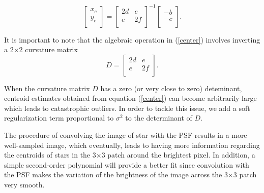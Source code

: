 \documentclass[12pt, preprint]{aastex}
\newcommand{\beq}{\begin{equation}}
\newcommand{\eeq}{\end{equation}}
\begin{document}
\beq
  \begin{bmatrix}
      x_{c}\\
      y_{c}\\
  \end{bmatrix} = 
  \begin{bmatrix}
      2d & e\\
      e & 2f\\
  \end{bmatrix}^{-1}
  \begin{bmatrix}
      -b\\
      -c\\
  \end{bmatrix}.
\label{center}
\eeq

It is important to note that the algebraic operation in (\ref{center}) involves 
inverting a 2$\times$2 curvature matrix
\beq
  D = 
  \begin{bmatrix}
      2d & e\\
      e & 2f\\
  \end{bmatrix}.
\eeq

When the curvature matrix $D$ has a zero (or very close to zero) deteminant,
centroid estimates obtained from equation (\ref{center}) can become arbitrarily 
large which leads to catastrophic outliers. 
In order to tackle this issue, we add a soft regularization term
proportional to $\sigma^{2}$ to the determinant of $D$.

The procedure of convolving the image of star with the PSF results in a
more well-sampled image, which eventually, leads to having more
information regarding the centroids of stars in the 3$\times$3 patch around the
brightest pixel. In addition, a simple second-order polynomial will provide a better fit 
since convolution with the PSF makes the variation of the brightness of the image
 across the 3$\times$3 patch very smooth.
 
\end{document}
